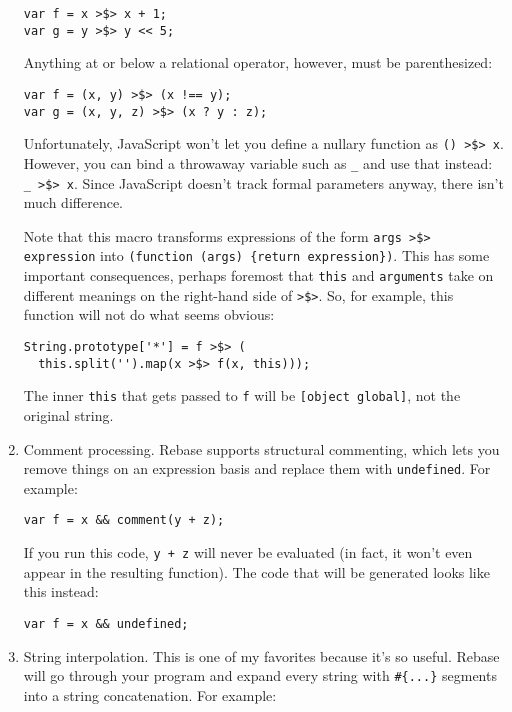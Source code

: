 \documentclass{report}
\begin{document}
\begin{enumerate}
\begin{verbatim}
var f = x >$> x + 1;
var g = y >$> y << 5;
\end{verbatim}

          Anything at or below a relational operator, however, must be parenthesized:

\begin{verbatim}
var f = (x, y) >$> (x !== y);
var g = (x, y, z) >$> (x ? y : z);
\end{verbatim}

          Unfortunately, JavaScript won't let you define a nullary function as \verb|() >$> x|. However, you can bind a throwaway variable such as \verb|_| and use that instead:
          \verb|_ >$> x|. Since JavaScript doesn't track formal parameters anyway, there isn't much difference.

          Note that this macro transforms expressions of the form \verb|args >$> expression| into \verb|(function (args) {return expression})|. This has some important consequences, perhaps
          foremost that \verb|this| and \verb|arguments| take on different meanings on the right-hand side of \verb|>$>|. So, for example, this function will not do what seems obvious:

\begin{verbatim}
String.prototype['*'] = f >$> (
  this.split('').map(x >$> f(x, this)));
\end{verbatim}

          The inner \verb|this| that gets passed to \verb|f| will be \verb|[object global]|, not the original string.

\item Comment processing. Rebase supports structural commenting, which lets you remove things on an expression basis and replace them with \verb|undefined|. For example:

\begin{verbatim}
var f = x && comment(y + z);
\end{verbatim}

          If you run this code, \verb|y + z| will never be evaluated (in fact, it won't even appear in the resulting function). The code that will be generated looks like this instead:

\begin{verbatim}
var f = x && undefined;
\end{verbatim}

\item String interpolation. This is one of my favorites because it's so useful. Rebase will go through your program and expand every string with \verb|#{...}| segments into a string
          concatenation. For example:


\end{enumerate}
\end{document}
